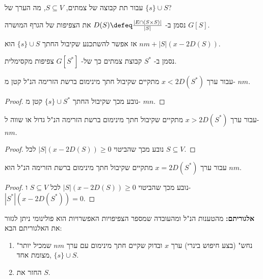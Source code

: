 עבור תת קבוצה של צמתים,  
$S \subseteq V$, 
מה הערך של 
\stcut{} $\{s\} \cup S$?

\begin{center}
\end{center}

נסמן ב-
$D(S) \defeq \frac{|E \cap (S \times S)|}{|S|}$ 
את הצפיפות של הגרף המושרה 
$G[S]$.

אז אפשר להשתכנע שקיבול החתך 
$\{s\} \cup S$ 
הוא
$nm + |S|(x - 2D(S))$.

נסמן ב-%
$S^*$ 
קבוצת צמתים כך של-%
$G[S^*]$ 
צפיפות מקסימלית.
\begin{claim}
עבור ערך 
$x < 2D(S^*)$ 
מתקיים שקיבול חתך מינימום ברשת הזרימה הנ"ל קטן מ-
$nm$.
\end{claim}

\begin{proof}
נובע מכך שקיבול החתך 
$\{s\} \cup S^*$
קטן מ-%
$mn$.
\end{proof}

\begin{claim}
עבור ערך 
$x > 2D(S^*)$ 
מתקיים שקיבול חתך מינימום ברשת הזרימה הנ"ל גדול או שווה ל-
$nm$.
\end{claim}

\begin{proof}
נובע מכך שהביטוי 
$|S|(x - 2D(S)) \geq 0$ 
לכל 
$S \subseteq V$.
\end{proof}

\begin{claim}
עבור ערך 
$x = 2D(S^*)$ 
מתקיים שקיבול חתך מינימום ברשת הזרימה הנ"ל הוא
$nm$.
\end{claim}

\begin{proof}
נובע מכך שהביטוי 
$|S|(x - 2D(S)) \geq 0$ 
לכל 
$S \subseteq V$
ו-
$|S^*|(x - 2D(S^*)) = 0$.
\end{proof}

\textbf{אלגוריתם:}
מהטענות הנ"ל ומהעובדה שמספר הצפיפויות האפשרויות הוא פולינומי ניתן לגזור את האלגוריתם הבא:

\begin{enumerate}
\item
"נחש" (בצע חיפוש בינרי) ערך $x$ ובדוק שקיים חתך מינימום עם ערך $nm$ שמכיל יותר מצומת אחד, 
$\{s\} \cup S$.
\item
החזר את 
$S$.
\end{enumerate}

